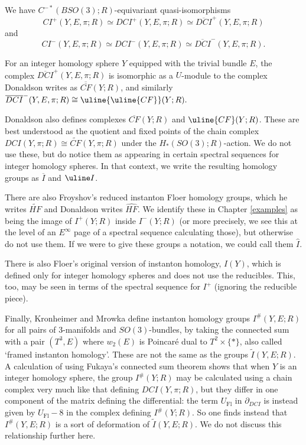 \documentclass{memo-l}
\theoremstyle{definition}
\theoremstyle{remark}
\numberwithin{section}{chapter}
\numberwithin{equation}{chapter}
\begin{document}
We have $C^{-*}(BSO(3);R)$-equivariant quasi-isomorphisms $$CI^+(Y,E,\pi; R) \simeq DCI^+(Y,E,\pi; R) \simeq \overline{DCI}^+(Y,E,\pi;R)$$ and $$CI^-(Y,E,\pi; R) \simeq DCI^-(Y,E,\pi; R) \simeq \overline{DCI}^-(Y,E,\pi;R).$$

For an integer homology sphere $Y$ equipped with the trivial bundle $E$, the complex $\overline{DCI}^+(Y,E,\pi;R)$ is isomorphic as a $U$-module to the complex Donaldson writes as $\overline{\overline{CF}}(Y;R)$, and similarly $\overline{DCI}^-(Y,E,\pi;R) \cong \uline{\uline{CF}}(Y;R).$ 

Donaldson also defines complexes $\overline{CF}(Y;R)$ and $\uline{CF}(Y;R)$. These are best understood as the quotient and fixed points of the chain complex $DCI(Y,\pi;R) \cong \widetilde{CF}(Y,\pi;R)$ under the $H_*(SO(3);R)$-action. We do not use these, but do notice them as appearing in certain spectral sequences for integer homology spheres. In that context, we write the resulting homology groups as $\overline I$ and $\uline I$.

There are also Froyshov's reduced instanton Floer homology groups, which he writes $\widetilde{HF}$ and Donaldson writes $\widehat{HF}$. We identify these in Chapter \ref{examples} as being the image of $I^+(Y;R)$ inside $I^-(Y;R)$ (or more precisely, we see this at the level of an $E^\infty$ page of a spectral sequence calculating those), but otherwise do not use them. If we were to give these groups a notation, we could call them $\widehat I$. 

There is also Floer’s original version of instanton homology, $I(Y)$, which is defined only for integer homology spheres and does not use the reducibles. This, too, may be seen in terms of the spectral sequence for $I^+$ (ignoring the reducible piece). 

Finally, Kronheimer and Mrowka define instanton homology groups $I^\#(Y,E;R)$ for all pairs of 3-manifolds and $SO(3)$-bundles, by taking the connected sum with a pair $(T^3, E)$ where $w_2(E)$ is Poincar\'e dual to $T^2 \times \{*\}$, also called `framed instanton homology'. These are not the same as the groups $\widetilde I(Y,E;R)$. A calculation of \cite{scaduto2015instantons} using Fukaya's connected sum theorem shows that when $Y$ is an integer homology sphere, the group $I^\#(Y;R)$ may be calculated using a chain complex very much like that defining $DCI(Y,\pi;R)$, but they differ in one component of the matrix defining the differential: the term $U_{\text{Fl}}$ in $\partial_{DCI}$ is instead given by $U_{\text{Fl}} - 8$ in the complex defining $I^\#(Y;R)$. So one finds instead that $I^\#(Y,E;R)$ is a sort of deformation of $\widetilde I(Y,E;R)$. We do not discuss this relationship further here. 
\end{document}
